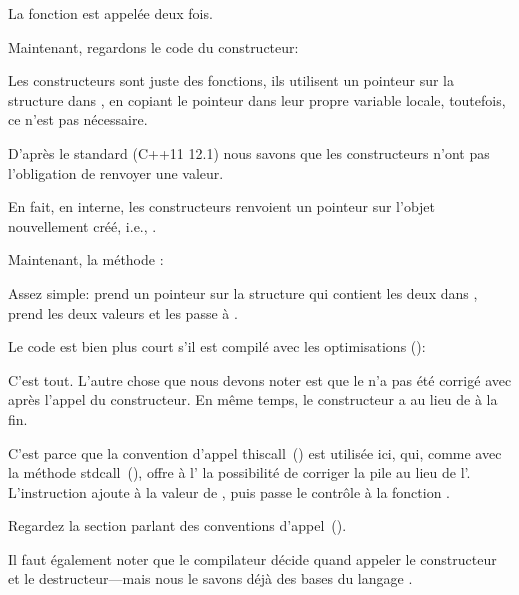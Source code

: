 La fonction  est appelée deux fois.

Maintenant, regardons le code du constructeur:



Les constructeurs sont juste des fonctions, ils utilisent un pointeur sur la structure
dans \ECX, en copiant le pointeur dans leur propre variable locale, toutefois, ce
n'est pas nécessaire.

D'après le standard (C++11 12.1) nous savons que les constructeurs n'ont pas l'obligation
de renvoyer une valeur.

En fait, en interne, les constructeurs renvoient un pointeur sur l'objet nouvellement
créé, i.e., \ITthis.

Maintenant, la méthode :



Assez simple:  prend un pointeur sur la structure qui contient les deux
\Tint dans \ECX, prend les deux valeurs et les passe à \printf.

Le code est bien plus court s'il est compilé avec les optimisations (\Ox):




C'est tout. L'autre chose que nous devons noter est que le 
n'a pas été corrigé avec  après l'appel du constructeur.
En même temps, le constructeur a  au lieu de \RET à la fin.


C'est parce que la convention d'appel thiscall~() est utilisée ici,
qui, comme avec la méthode stdcall~(), offre à l'
la possibilité de corriger la pile au lieu de l'.
L'instruction  ajoute  à la valeur de \ESP, puis passe le contrôle
à la fonction .

Regardez la section parlant des conventions d'appel~().

Il faut également noter que le compilateur décide quand appeler le constructeur et
le destructeur---mais nous le savons déjà des bases du langage \Cpp.

